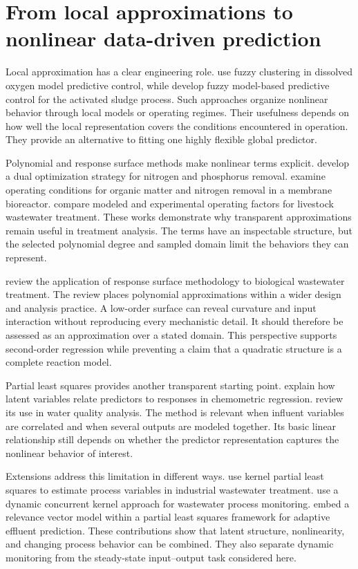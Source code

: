 \section{From local approximations to nonlinear data-driven prediction}

Local approximation has a clear engineering role. \citet{Li2020} use fuzzy clustering in dissolved oxygen model predictive control, while \citet{Yang2014} develop fuzzy model-based predictive control for the activated sludge process. Such approaches organize nonlinear behavior through local models or operating regimes. Their usefulness depends on how well the local representation covers the conditions encountered in operation. They provide an alternative to fitting one highly flexible global predictor.

Polynomial and response surface methods make nonlinear terms explicit. \citet{Kim2009} develop a dual optimization strategy for nitrogen and phosphorus removal. \citet{Lim2011} examine operating conditions for organic matter and nitrogen removal in a membrane bioreactor. \citet{Ahn2014} compare modeled and experimental operating factors for livestock wastewater treatment. These works demonstrate why transparent approximations remain useful in treatment analysis. The terms have an inspectable structure, but the selected polynomial degree and sampled domain limit the behaviors they can represent.

\citet{Nazlabadi2021} review the application of response surface methodology to biological wastewater treatment. The review places polynomial approximations within a wider design and analysis practice. A low-order surface can reveal curvature and input interaction without reproducing every mechanistic detail. It should therefore be assessed as an approximation over a stated domain. This perspective supports second-order regression while preventing a claim that a quadratic structure is a complete reaction model.

Partial least squares provides another transparent starting point. \citet{Wold2001} explain how latent variables relate predictors to responses in chemometric regression. \citet{Khatri2020} review its use in water quality analysis. The method is relevant when influent variables are correlated and when several outputs are modeled together. Its basic linear relationship still depends on whether the predictor representation captures the nonlinear behavior of interest.

Extensions address this limitation in different ways. \citet{Woo2009} use kernel partial least squares to estimate process variables in industrial wastewater treatment. \citet{Liu2021} use a dynamic concurrent kernel approach for wastewater process monitoring. \citet{Yang2021} embed a relevance vector model within a partial least squares framework for adaptive effluent prediction. These contributions show that latent structure, nonlinearity, and changing process behavior can be combined. They also separate dynamic monitoring from the steady-state input--output task considered here.

